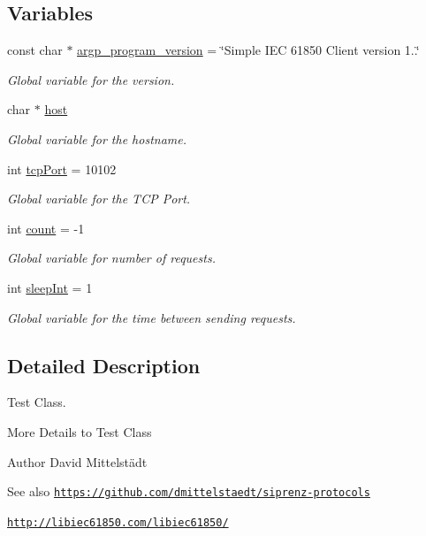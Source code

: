 \subsection*{Variables}
\begin{DoxyCompactItemize}
\item 
const char $\ast$ \hyperlink{simple-iec61850-client_8c_a62f73ea01c816f1996aed4c66f57c4fb}{argp\+\_\+program\+\_\+version} = \char`\"{}Simple I\+EC 61850 Client version 1..\char`\"{}
\begin{DoxyCompactList}\small\item\em Global variable for the version. \end{DoxyCompactList}\item 
char $\ast$ \hyperlink{simple-iec61850-client_8c_a1c2046dcb30a629d6d9f45ff8f403f12}{host}
\begin{DoxyCompactList}\small\item\em Global variable for the hostname. \end{DoxyCompactList}\item 
int \hyperlink{simple-iec61850-client_8c_ac31354d08316076b496efb2b3a2c69e6}{tcp\+Port} = 10102
\begin{DoxyCompactList}\small\item\em Global variable for the T\+CP Port. \end{DoxyCompactList}\item 
int \hyperlink{simple-iec61850-client_8c_ad43c3812e6d13e0518d9f8b8f463ffcf}{count} = -\/1
\begin{DoxyCompactList}\small\item\em Global variable for number of requests. \end{DoxyCompactList}\item 
int \hyperlink{simple-iec61850-client_8c_a7c0b25939579bd308b11966fb04288e0}{sleep\+Int} = 1
\begin{DoxyCompactList}\small\item\em Global variable for the time between sending requests. \end{DoxyCompactList}\end{DoxyCompactItemize}


\subsection{Detailed Description}
Test Class. 

More Details to Test Class

\begin{DoxyAuthor}{Author}
David Mittelstädt 
\end{DoxyAuthor}
\begin{DoxySeeAlso}{See also}
\href{https://github.com/dmittelstaedt/siprenz-protocols}{\tt https\+://github.\+com/dmittelstaedt/siprenz-\/protocols} 

\href{http://libiec61850.com/libiec61850/}{\tt http\+://libiec61850.\+com/libiec61850/} 
\end{DoxySeeAlso}


